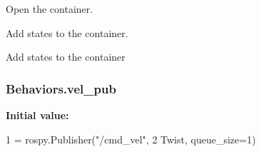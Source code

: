 Open the container. 

Add states to the container.

Add states to the container 
\subsubsection[{\texorpdfstring{vel\+\_\+pub}{vel_pub}}]{\setlength{\rightskip}{0pt plus 5cm}Behaviors.\+vel\+\_\+pub}\hypertarget{namespaceBehaviors_a56b79b8920b23a79eb3459479c6342eb}{}\label{namespaceBehaviors_a56b79b8920b23a79eb3459479c6342eb}
{\bfseries Initial value\+:}
\begin{DoxyCode}
1 = rospy.Publisher(\textcolor{stringliteral}{"/cmd\_vel"},
2                                        Twist, queue\_size=1)
\end{DoxyCode}
